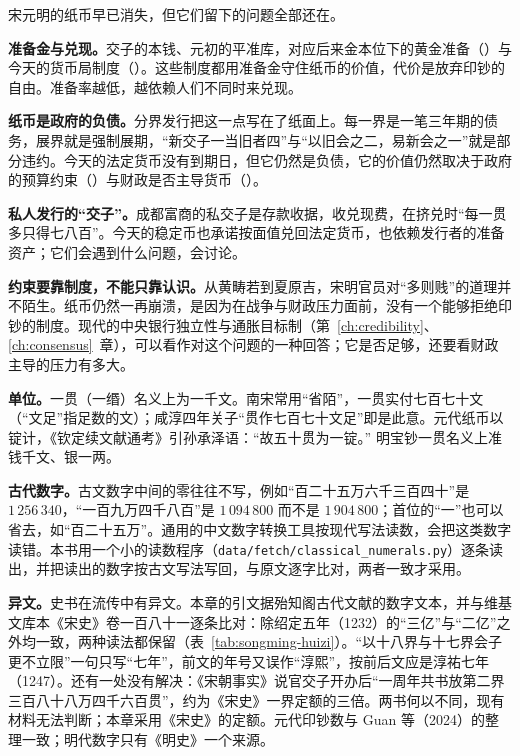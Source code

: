 宋元明的纸币早已消失，但它们留下的问题全部还在。

\textbf{准备金与兑现。}交子的本钱、元初的平准库，对应后来金本位下的黄金准备（）与今天的货币局制度（）。这些制度都用准备金守住纸币的价值，代价是放弃印钞的自由。准备率越低，越依赖人们不同时来兑现。

\textbf{纸币是政府的负债。}分界发行把这一点写在了纸面上。每一界是一笔三年期的债务，展界就是强制展期，“新交子一当旧者四”与“以旧会之二，易新会之一”就是部分违约。今天的法定货币没有到期日，但它仍然是负债，它的价值仍然取决于政府的预算约束（）与财政是否主导货币（）。

\textbf{私人发行的“交子”。}成都富商的私交子是存款收据，收兑现费，在挤兑时“每一贯多只得七八百”。今天的稳定币也承诺按面值兑回法定货币，也依赖发行者的准备资产；它们会遇到什么问题，会讨论。

\textbf{约束要靠制度，不能只靠认识。}从黄畴若到夏原吉，宋明官员对“多则贱”的道理并不陌生。纸币仍然一再崩溃，是因为在战争与财政压力面前，没有一个能够拒绝印钞的制度。现代的中央银行独立性与通胀目标制（第~\ref{ch:credibility}、\ref{ch:consensus}~章），可以看作对这个问题的一种回答；它是否足够，还要看财政主导的压力有多大。

\begin{deeper}[单位、古代数字与异文]
\textbf{单位。}一贯（一缗）名义上为一千文。南宋常用“省陌”，一贯实付七百七十文（“文足”指足数的文）；咸淳四年关子“贯作七百七十文足”即是此意。元代纸币以锭计，《钦定续文献通考》引孙承泽语：“故五十贯为一锭。”\cite{xuwenxiantongkao} 明宝钞一贯名义上准钱千文、银一两。

\textbf{古代数字。}古文数字中间的零往往不写，例如“百二十五万六千三百四十”是 $1\,256\,340$，“一百九万四千八百”是 $1\,094\,800$ 而不是 $1\,904\,800$；首位的“一”也可以省去，如“百二十五万”。通用的中文数字转换工具按现代写法读数，会把这类数字读错。本书用一个小的读数程序（\texttt{data/fetch/classical\_numerals.py}）逐条读出，并把读出的数字按古文写法写回，与原文逐字比对，两者一致才采用。

\textbf{异文。}史书在流传中有异文。本章的引文据殆知阁古代文献的数字文本\cite{songshi}，并与维基文库本《宋史》卷一百八十一逐条比对：除绍定五年（1232）的“三亿”与“二亿”之外均一致，两种读法都保留（表~\ref{tab:songming-huizi}）。“以十八界与十七界会子更不立限”一句只写“七年”，前文的年号又误作“淳熙”，按前后文应是淳祐七年（1247）。还有一处没有解决：《宋朝事实》说官交子开办后“一周年共书放第二界三百八十八万四千六百贯”\cite{songchaoshishi}，约为《宋史》一界定额的三倍。两书何以不同，现有材料无法判断；本章采用《宋史》的定额。元代印钞数与 Guan 等（2024）的整理一致；明代数字只有《明史》一个来源。
\end{deeper}

